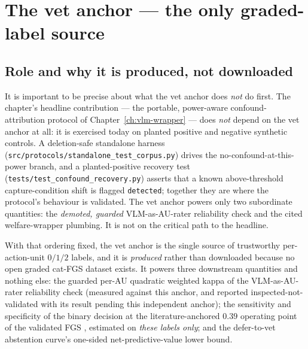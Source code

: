 \section{The vet anchor --- the only graded-label source}
\label{sec:vet-anchor}

\subsection{Role and why it is produced, not downloaded}

It is important to be precise about what the vet anchor does \emph{not} do
first. The chapter's headline contribution --- the portable, power-aware
confound-attribution protocol of Chapter~\ref{ch:vlm-wrapper} --- does
\emph{not} depend on the vet anchor at all: it is exercised today on planted
positive and negative synthetic controls. A deletion-safe standalone harness
(\texttt{src/protocols/standalone\_test\_corpus.py}) drives the
no-confound-at-this-power branch, and a planted-positive recovery test
(\texttt{tests/test\_confound\_recovery.py}) asserts that a known
above-threshold capture-condition shift is flagged \texttt{detected}; together
they are where the protocol's behaviour is validated. The vet anchor powers only
two subordinate quantities:
the \emph{demoted, guarded} VLM-as-AU-rater reliability check and the cited
welfare-wrapper plumbing. It is not on the critical path to the headline.

With that ordering fixed, the vet anchor is the single source of trustworthy
per-action-unit $0/1/2$ labels, and it is \emph{produced} rather than downloaded
because no open graded cat-FGS dataset exists. It powers three downstream
quantities and nothing else: the guarded per-AU quadratic weighted kappa of the
VLM-as-AU-rater reliability check (measured against this anchor, and reported
inspected-not-validated with its result pending this independent anchor); the
sensitivity and specificity of the binary decision at the literature-anchored
$0.39$ operating point of the validated FGS \citep{evangelista2019}, estimated
on \emph{these labels only}; and the defer-to-vet abstention curve's one-sided
net-predictive-value lower bound.


